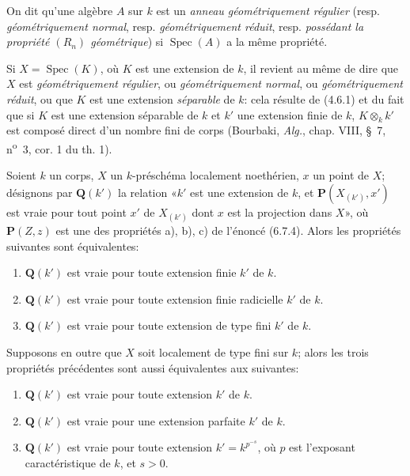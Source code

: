 On dit qu'une algèbre $A$ sur $k$ est un \emph{anneau géométriquement régulier}
(resp. \emph{géométriquement normal}, resp. \emph{géométriquement réduit}, resp.
\emph{possédant la propriété $(R_n)$ géométrique}) si $\operatorname{Spec}(A)$
a la même propriété.

Si $X=\operatorname{Spec}(K)$, où $K$ est une extension de $k$, il revient
au même de dire que $X$ est \emph{géométriquement régulier}, ou \emph{géométriquement
normal}, ou \emph{géométriquement réduit}, ou que $K$ est une extension \emph{séparable}
de $k$: cela résulte de (4.6.1) et du fait que si $K$ est une extension
séparable de $k$ et $k'$ une extension finie de $k$, $K\otimes_k k'$ est
composé direct d'un nombre fini de corps (Bourbaki, \emph{Alg.}, chap. VIII,
§~7, n\textsuperscript{o}~3, cor. 1 du th. 1).


\begin{proposition}[6.7.7]
\label{IV.2.s6.7.7-fr}
Soient $k$ un corps, $X$ un $k$-préschéma localement noethérien, $x$ un
point de $X$; désignons par $\boldsymbol{Q}(k')$ la relation «$k'$ est une extension de
$k$, et $\boldsymbol{P}(X_{(k')},x')$ est vraie pour tout point $x'$ de $X_{(k')}$ dont
$x$ est la projection dans $X$», où $\boldsymbol{P}(Z,z)$ est une des propriétés \textup{a),
b), c)} de l'énoncé \textup{(6.7.4)}. Alors les propriétés suivantes sont équivalentes:
\begin{enumerate}
\item[\textup{a)}] $\boldsymbol{Q}(k')$ est vraie pour toute extension finie $k'$ de $k$.
\item[\textup{b)}] $\boldsymbol{Q}(k')$ est vraie pour toute extension finie radicielle $k'$ de $k$.
\item[\textup{c)}] $\boldsymbol{Q}(k')$ est vraie pour toute extension de type fini $k'$ de $k$.
\end{enumerate}
Supposons en outre que $X$ soit localement de type fini sur $k$; alors les
trois propriétés précédentes sont aussi équivalentes aux suivantes:
\begin{enumerate}
\item[\textup{d)}] $\boldsymbol{Q}(k')$ est vraie pour toute extension $k'$ de $k$.
\item[\textup{e)}] $\boldsymbol{Q}(k')$ est vraie pour \textup{une} extension parfaite $k'$ de $k$.
\item[\textup{f)}] $\boldsymbol{Q}(k')$ est vraie pour toute extension $k'=k^{p^{-s}}$, où $p$ est
l'exposant caractéristique de $k$, et $s>0$.
\end{enumerate}
\end{proposition}

